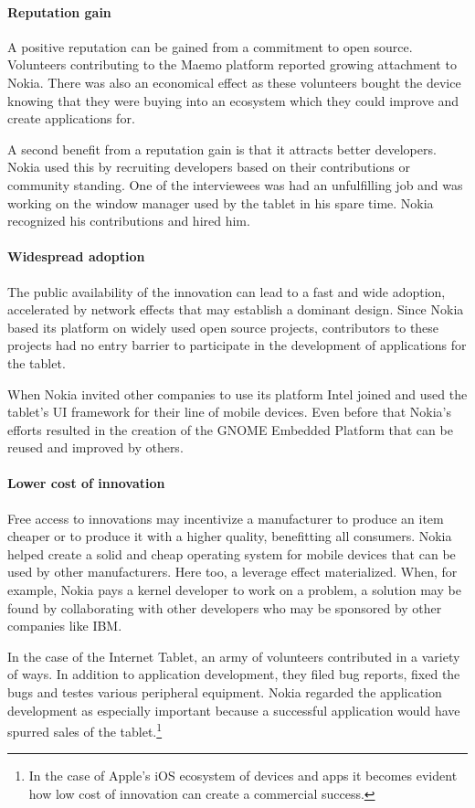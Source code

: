 \documentclass[a4paper]{scrartcl}
\begin{document}
\paragraph{Reputation gain}
A positive reputation can be gained from a commitment to open source. 
Volunteers contributing to the Maemo platform reported growing attachment to Nokia.
There was also an economical effect as these volunteers bought the device knowing that they were buying into an ecosystem which they could improve and create applications for. 

A second benefit from a reputation gain is that it attracts better developers.
Nokia used this by recruiting developers based on their contributions or community standing. 
One of the interviewees was had an unfulfilling job and was working on the window manager used by the tablet in his spare time.
Nokia recognized his contributions and hired him.

\paragraph{Widespread adoption}
The public availability of the innovation can lead to a fast and wide adoption, accelerated by network effects that may establish a dominant design.
Since Nokia based its platform on widely used open source projects, contributors to these projects had no entry barrier to participate in the development of applications for the tablet.

When Nokia invited other companies to use its platform Intel joined and used the tablet's UI framework for their line of mobile devices.
Even before that Nokia's efforts resulted in the creation of the GNOME Embedded Platform that can be reused and improved by others.


\paragraph{Lower cost of innovation}
Free access to innovations may incentivize a manufacturer to produce an item cheaper or to produce it with a higher quality, benefitting all consumers.
Nokia helped create a solid and cheap operating system for mobile devices that can be used by other manufacturers.
Here too, a leverage effect materialized.
When, for example, Nokia pays a kernel developer to work on a problem, a solution may be found by collaborating with other developers who may be sponsored by other companies like IBM.

In the case of the Internet Tablet, an army of volunteers contributed in a variety of ways.
In addition to application development, they filed bug reports, fixed the bugs and testes various peripheral equipment.
Nokia regarded the application development as especially important because a successful application would have spurred sales of the tablet.\footnote{In the case of Apple's iOS ecosystem of devices and apps it becomes evident how low cost of innovation can create a commercial success.}
\end{document}
